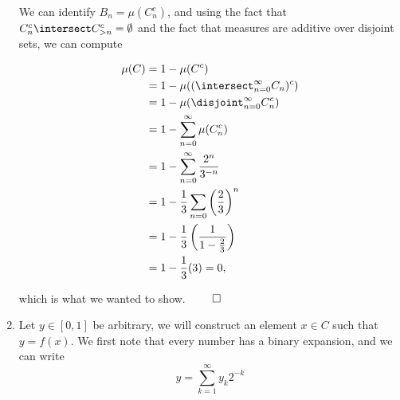 \begin{solution}
\begin{enumerate}
    We can identify $B_n = \mu(C_n^c)$, and using the fact that $C_n^c \intersect C_{>n}^c = \emptyset$ and the fact that measures are additive over disjoint sets, we can compute

    \[
    \begin{align*}
      \mu(C) &= 1 - \mu(C^c) \\
             &= 1 - \mu((\intersect_{n=0}^\infty C_n)^c) \\
             &= 1 - \mu(\disjoint_{n=0}^\infty C_n^c) \\
             &= 1 - \sum_{n=0}^\infty \mu(C_n^c) \\
             &= 1 - \sum_{n=0}^\infty \frac{2^n}{3^{-n}} \\
             &= 1 - \frac 1 3 \sum_{n=0} \left( \frac 2 3 \right)^n \\
             &= 1 - \frac 1 3 \left( \frac 1 {1-\frac 2 3} \right) \\
             &= 1 - \frac 1 3 (3)  = 0,
    \end{align*}
    \]

    which is what we wanted to show. $\qed$

  \item Let $y\in [0,1]$ be arbitrary, we will construct an element $x\in C$ such that $y = f(x)$. We first note that every number has a binary expansion, and we can write
    $$
    y = \sum_{k=1}^\infty y_k 2^{-k}
    $$
  \end{enumerate}
\end{solution}
